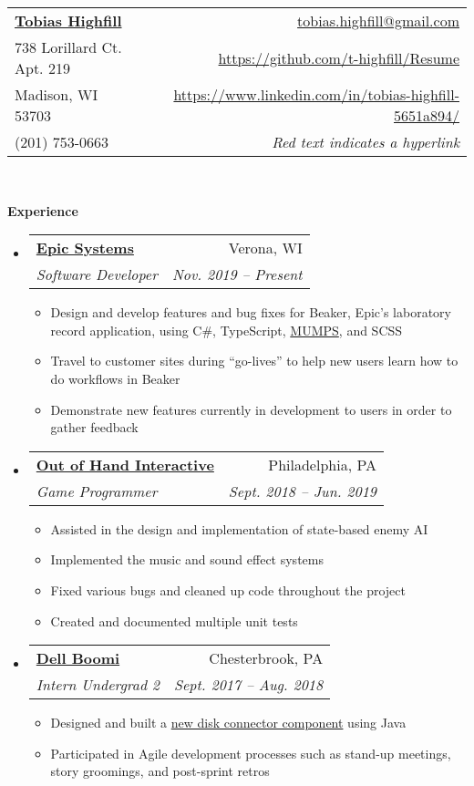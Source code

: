 \documentclass[letterpaper,11pt]{article}
\makeatletter
\newcommand{\resitem}[1]{\item #1 \vspace{-2pt}}
\newcommand{\resheading}[1]{{\large \colorbox{mygrey}{\begin{minipage}{\textwidth}{\textbf{#1 \vphantom{p\^{E}}}}\end{minipage}}}}
\newcommand{\ressubheading}[4]{
\begin{tabular*}{6.5in}{l@{\extracolsep{\fill}}r}
		\textbf{#1} & #2 \\
		\textit{#3} & \textit{#4} \\
\end{tabular*}\vspace{-6pt}}
\newcommand{\myemail}{tobias.highfill@gmail.com}
\newcommand{\mywebsite}{https://github.com/t-highfill/Resume}
\newcommand{\linkedin}{https://www.linkedin.com/in/tobias-highfill-5651a894/}
\newcommand{\smallsect}[1]{{\footnotesize #1}}
\makeatother
\begin{document}
\newcommand{\myheader}{
\begin{tabular*}{7in}{l@{\extracolsep{\fill}}r}
	\textbf{\href{\mywebsite}{\LARGE Tobias Highfill}} & \href{mailto:\myemail}{\myemail}\\
	738 Lorillard Ct. Apt. 219 & \href{\mywebsite}{\mywebsite} \\
	Madison, WI 53703 & \href{\linkedin}{\linkedin} \\
	(201) 753-0663 & \smallsect{\textit{Red text indicates a hyperlink}} \\
	\end{tabular*}
\\
\vspace{0.1in}}

\myheader

\resheading{Experience}
\begin{itemize}
	\item \ressubheading{\href{https://www.epic.com/}{Epic Systems}}{Verona, WI}{Software Developer}{Nov. 2019 -- Present}
		\smallsect{
		\begin{itemize}
			\resitem{Design and develop features and bug fixes for Beaker, Epic's laboratory record application, using C\#, TypeScript, \href{https://en.wikipedia.org/wiki/MUMPS}{MUMPS}, and SCSS}
			\resitem{Travel to customer sites during ``go-lives'' to help new users learn how to do workflows in Beaker}
			\resitem{Demonstrate new features currently in development to users in order to gather feedback}
		\end{itemize}
		}
	\item \ressubheading{\href{https://outofhandinteractive.wordpress.com/}{Out of Hand Interactive}}{Philadelphia, PA}{Game Programmer}{Sept. 2018 -- Jun. 2019}
		\smallsect{
		\begin{itemize}
			\resitem{Assisted in the design and implementation of state-based enemy AI}
			\resitem{Implemented the music and sound effect systems}
			\resitem{Fixed various bugs and cleaned up code throughout the project}
			\resitem{Created and documented multiple unit tests}
		\end{itemize}
		}
	\item \ressubheading{\href{https://boomi.com/}{Dell Boomi}}{Chesterbrook, PA}{Intern Undergrad 2}{Sept. 2017 -- Aug. 2018}
		\smallsect{
		\begin{itemize}
			\resitem{Designed and built a \href{https://help.boomi.com/bundle/connectors/page/int-Disk_v2_connector.html}{new disk connector component} using Java}
			\resitem{Participated in Agile development processes such as stand-up meetings, story groomings, and post-sprint retros}

\end{itemize}}
\end{itemize}
\end{document}
